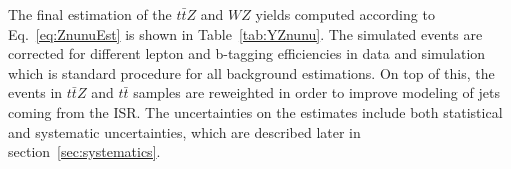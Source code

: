 The final estimation of the $t\bar{t}Z$ and $WZ$ yields computed according to Eq.~\ref{eq:ZnunuEst} is shown in Table~\ref{tab:YZnunu}. The simulated events are corrected for different lepton and b-tagging efficiencies in data and simulation which is standard procedure for all background estimations. On top of this, the events in $t\bar{t}Z$ and $t\bar{t}$ samples are reweighted in order to improve modeling of jets coming from the ISR. The uncertainties on the estimates include both statistical and systematic uncertainties, which are described later in section~\ref{sec:systematics}.


\begin{table}[h]
\centering
\end{table}
